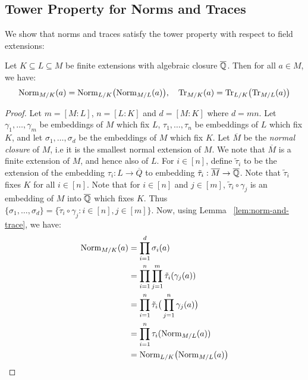 \documentclass[11pt]{article}
\begin{document}
\subsection{Tower Property for Norms and Traces}\label{subsec:norms-tower-prop}
We show that norms and traces satisfy the tower property with respect to field extensions:
\begin{lemma}\label{lem:norm-tower-prop}
Let $K\subseteq L\subseteq M$ be finite extensions with algebraic closure $\overline{\mathbb{Q}}$. Then for all $a\in M$, we have:
\begin{equation*}
\mathrm{Norm}_{M/{K}}(a) = \mathrm{Norm}_{L/{K}}\big(\mathrm{Norm}_{M/{L}}(a)\big),\quad \mathrm{Tr}_{M/{K}}(a) = \mathrm{Tr}_{L/{K}}\big(\mathrm{Tr}_{M/{L}}(a)\big)
\end{equation*}
\end{lemma}
\begin{proof}
Let $m=[M:L]$, $n=[L:K]$ and $d=[M:K]$ where $d=mn$. Let $\gamma_1,\ldots,\gamma_m$ be embeddings of $M$ which fix $L$,
$\tau_1,\ldots,\tau_n$ be embeddings of $L$ which fix $K$, and let $\sigma_1,\ldots,\sigma_d$ be the embeddings of $M$
which fix $K$. Let $\overline{M}$ be the {\em normal closure} of $M$, i.e it is the smallest normal extension of $M$. We
note that $\overline{M}$ is a finite extension of $M$, and hence also of $L$. For $i\in [n]$, define $\tilde{\tau}_i$ to
be the extension of the embedding $\tau_i:L\rightarrow \overline{Q}$ to embedding $\tilde{\tau}_i:\overline{M}\rightarrow \overline{\mathbb{Q}}$.
Note that $\tilde{\tau}_i$ fixes $K$ for all $i\in [n]$. Note that for $i\in [n]$ and $j\in [m]$, $\tilde{\tau}_i\circ \gamma_j$ is an
embedding of $M$ into $\overline{\mathbb{Q}}$ which fixes $K$. Thus $\{\sigma_1,\ldots,\sigma_d\}=\{\tilde{\tau}_i\circ \gamma_j: i\in [n],j\in [m]\}$.
Now, using Lemma ~\ref{lem:norm-and-trace}, we have:
\begin{align*}
\mathrm{Norm}_{M/{K}}(a) &= \prod_{i=1}^d \sigma_i(a) \\
    &= \prod_{i=1}^n \prod_{j=1}^m \tilde{\tau}_i(\gamma_j(a)) \\
    &= \prod_{i=1}^n \tilde{\tau}_i\big(\prod_{j=1}^n \gamma_j(a)\big) \\
    &=  \prod_{i=1}^n \tau_i(\mathrm{Norm}_{M/{L}}(a)) \\
    &= \mathrm{Norm}_{L/{K}}\big(\mathrm{Norm}_{M/{L}}(a)\big)
\end{align*}
\end{proof}
\end{document}
